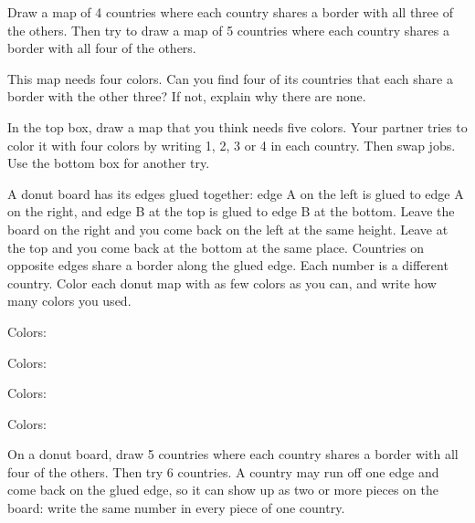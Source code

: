 \documentclass[12pt]{extarticle}
\newcommand{\dmap}[1]{\begin{minipage}[t]{0.48\linewidth}\centering\fig{#1}\par\vspace{0.2cm}\hfill Colors: \blank\end{minipage}}
\begin{document}
\newpage
{}Draw a map of 4 countries where each country shares a border with all three of the others. Then try to draw a map of 5 countries where each country shares a border with all four of the others.

\vspace{0.4cm}
\noindent{}\hfill{}

\vspace{0.9cm}
This map needs four colors. Can you find four of its countries that each share a border with the other three? If not, explain why there are none.

\vspace{0.3cm}
\noindent\begin{minipage}[t]{0.38\linewidth}\vspace{0pt}\end{minipage}\hfill
\begin{minipage}[t]{0.58\linewidth}\vspace{0pt}\end{minipage}

\newpage
{}In the top box, draw a map that you think needs five colors. Your partner tries to color it with four colors by writing 1, 2, 3 or 4 in each country. Then swap jobs. Use the bottom box for another try.

\vspace{0.5cm}
\centerline{}
\vspace{0.6cm}
\centerline{}

\newpage
{}A donut board has its edges glued together: edge A on the left is glued to edge A on the right, and edge B at the top is glued to edge B at the bottom. Leave the board on the right and you come back on the left at the same height. Leave at the top and you come back at the bottom at the same place. Countries on opposite edges share a border along the glued edge. Each number is a different country. Color each donut map with as few colors as you can, and write how many colors you used.

\vspace{0.6cm}
\noindent\dmap{d_stripes4}\hfill\dmap{d_stripes3}

\vspace{0.7cm}
\noindent\dmap{d_grid4}\hfill\dmap{d_grid3}

\newpage
{}On a donut board, draw 5 countries where each country shares a border with all four of the others. Then try 6 countries. A country may run off one edge and come back on the glued edge, so it can show up as two or more pieces on the board: write the same number in every piece of one country.
\end{document}
